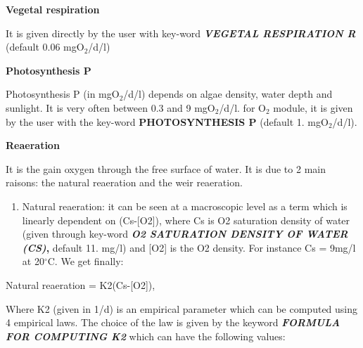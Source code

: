 \documentclass{article} %
\begin{document}
{\bf  Vegetal respiration}

 It is given directly by the user with key-word \textbf{\textit{VEGETAL RESPIRATION R}} (default 0.06 mgO${}_{2}$/d/l)


{\bf  Photosynthesis P}

 Photosynthesis P (in mgO${}_{2}$/d/l) depends on algae density, water depth and sunlight. It is very often between 0.3 and 9 mgO${}_{2}$/d/l. for O${}_{2}$ module, it is given by the user with the key-word \textbf{PHOTOSYNTHESIS P} (default 1. mgO${}_{2}$/d/l).


{\bf  Reaeration}

 It is the gain oxygen through the free surface of water. It is due to 2 main raisons:  the natural reaeration and the weir reaeration.

\begin{enumerate}
\item  Natural reaeration: it can be seen at a macroscopic level as a term which is linearly dependent on (Cs-[O2]), where Cs is O2 saturation density of water (given through key-word \textbf{\textit{O2 SATURATION DENSITY OF WATER (CS)},} default 11. mg/l) and [O2] is the O2 density. For instance Cs = 9mg/l at 20${}^\circ$C.  We get finally:
\end{enumerate}

 Natural reaeration = K2(Cs-[O2]),



 Where K2 (given in 1/d) is an empirical parameter which can be computed using 4 empirical laws. The choice of the law is given by the keyword \textbf{\textit{FORMULA FOR COMPUTING K2}} which can have the following values:
\end{document}
